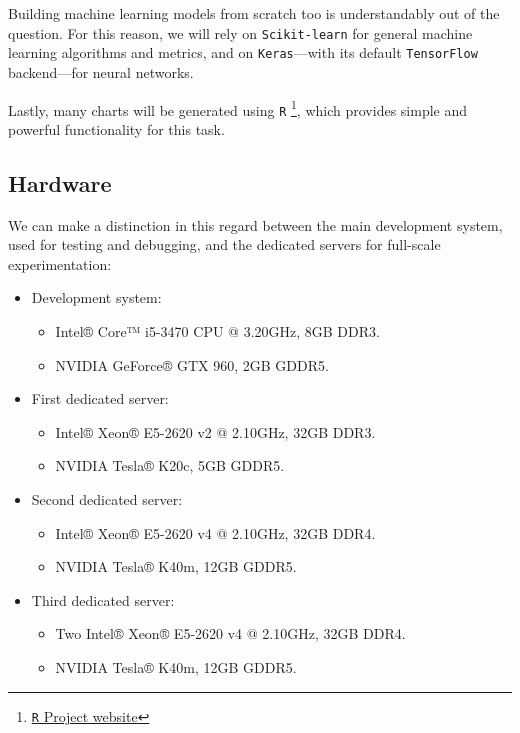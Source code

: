 		Building machine learning models from scratch too is understandably out of the question. For this reason, we will rely on \texttt{Scikit-learn} for general machine learning algorithms and metrics, and on \texttt{Keras}---with its default \texttt{TensorFlow} backend---for neural networks.

		Lastly, many charts will be generated using \texttt{R} \footnote{\href{https://www.r-project.org/}{\texttt{R} Project website}}, which provides simple and powerful functionality for this task.

	\subsection{Hardware}

		We can make a distinction in this regard between the main development system, used for testing and debugging, and the dedicated servers for full-scale experimentation:

		\begin{itemize}

			\item
			Development system:

			\begin{itemize}

				\item
				Intel® Core™ i5-3470 CPU @ 3.20GHz, 8GB DDR3.
				\item
				NVIDIA GeForce® GTX 960, 2GB GDDR5.

			\end{itemize}

			\item
			First dedicated server:

			\begin{itemize}

				\item
				Intel® Xeon® E5-2620 v2 @ 2.10GHz, 32GB DDR3.
				\item
				NVIDIA Tesla® K20c, 5GB GDDR5.

			\end{itemize}

			\item
			Second dedicated server:

			\begin{itemize}

				\item
				Intel® Xeon® E5-2620 v4 @ 2.10GHz, 32GB DDR4.
				\item
				NVIDIA Tesla® K40m, 12GB GDDR5.

			\end{itemize}

			\item
			Third dedicated server:

			\begin{itemize}

				\item
				Two Intel® Xeon® E5-2620 v4 @ 2.10GHz, 32GB DDR4.
				\item
				NVIDIA Tesla® K40m, 12GB GDDR5.

			\end{itemize}

		\end{itemize}

